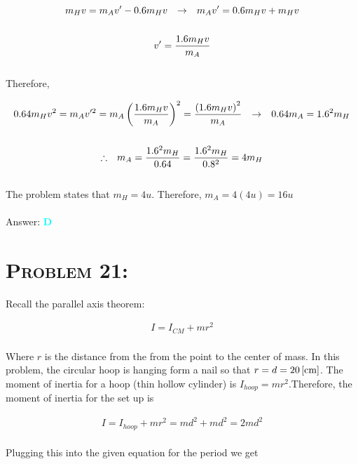 \documentclass{article}
\begin{document}
\begin{gather}
m_{H}v = m_{A}v' - 0.6m_{H}v \hspace{.1in} \rightarrow \hspace{.1in} m_{A}v' = 0.6m_{H}v+ m_{H}v\nonumber\\
\nonumber\\
v' = \frac{1.6m_{H}v}{m_{A}}\nonumber
\end{gather}
\\
Therefore,

\begin{gather}
0.64 m_{H}v^{2} = m_{A} v'^{2} = m_{A} \left(\frac{1.6m_{H}v}{m_{A}}\right)^{2} = \frac{\left(1.6m_{H}v\right)^{2}} {m_{A}} \hspace{.1in} \rightarrow \hspace{.1in} 0.64m_{A} = 1.6^{2} m_{H}\nonumber\\
\nonumber\\
\therefore \hspace{.1in} m_{A} = \frac{1.6^{2} m_{H}}{0.64} = \frac{1.6^{2} m_{H}}{0.8^{2}} = 4m_{H}\nonumber
\end{gather}
\\
The problem states that $m_{H} = 4u$. Therefore, $m_{A} = 4(4u) = \boxed{16u}$
\\\\
Answer: \textbf{\textcolor{cyan}D}\\


\section{\textsc{Problem 21:}} Recall the parallel axis theorem:

\begin{gather}
\label{eq: parax} I = I_{CM} + mr^{2}
\end{gather}
\\
Where $r$ is the distance from the from the point to the center of mass. In this problem, the circular hoop is hanging form a nail so that $r = d = \unit[20]{[cm]}$. The moment of inertia for a hoop (thin hollow cylinder) is $I_{hoop} = mr^{2}$.Therefore, the moment of inertia for the set up is

\begin{gather}
I = I_{hoop} + mr^{2} = md^{2} + md^{2} = 2md^{2}\nonumber
\end{gather}
\\
Plugging this into the given equation for the period we get
\end{document}
